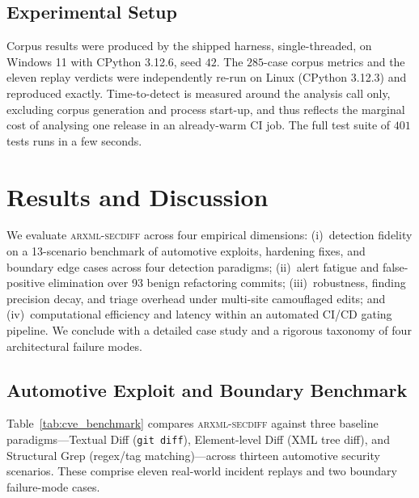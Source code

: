 \documentclass[journal]{IEEEtran}
\begin{document}
\subsection{Experimental Setup}
Corpus results were produced by the shipped harness, single-threaded, on Windows
11 with CPython 3.12.6, seed $42$. The $285$-case corpus metrics and the eleven
replay verdicts were independently re-run on Linux (CPython 3.12.3) and
reproduced exactly. Time-to-detect is measured around the analysis call only,
excluding corpus generation and process start-up, and thus reflects the marginal
cost of analysing one release in an already-warm CI job. The full test suite of
$401$ tests runs in a few seconds.

\section{Results and Discussion}
\label{sec:results}

We evaluate \textsc{arxml-secdiff} across four empirical dimensions: (i)~detection fidelity on a 13-scenario benchmark of automotive exploits, hardening fixes, and boundary edge cases across four detection paradigms; (ii)~alert fatigue and false-positive elimination over 93 benign refactoring commits; (iii)~robustness, finding precision decay, and triage overhead under multi-site camouflaged edits; and (iv)~computational efficiency and latency within an automated CI/CD gating pipeline. We conclude with a detailed case study and a rigorous taxonomy of four architectural failure modes.

\subsection{Automotive Exploit and Boundary Benchmark}
\label{subsec:cve_benchmark}

Table~\ref{tab:cve_benchmark} compares \textsc{arxml-secdiff} against three baseline paradigms---Textual Diff (\texttt{git diff}), Element-level Diff (XML tree diff), and Structural Grep (regex/tag matching)---across thirteen automotive security scenarios. These comprise eleven real-world incident replays and two boundary failure-mode cases.
\end{document}

